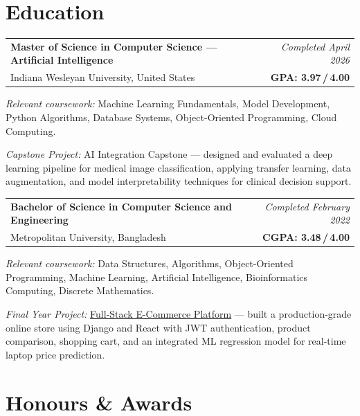 \documentclass[11pt, letterpaper]{article}
\begin{document}
\section{Education}

\noindent
\begin{tabularx}{\linewidth}{@{}X r@{}}
  \textbf{Master of Science in Computer Science — Artificial Intelligence}
    & \textit{Completed April 2026} \\
  Indiana Wesleyan University, United States
    & \textbf{GPA: 3.97\,/\,4.00}
\end{tabularx}

\vspace{3pt}
\textit{Relevant coursework:} Machine Learning Fundamentals, Model Development,
Python Algorithms, Database Systems, Object-Oriented Programming, Cloud Computing.

\vspace{3pt}
\textit{Capstone Project:} AI Integration Capstone — designed and evaluated a
deep learning pipeline for medical image classification, applying transfer learning,
data augmentation, and model interpretability techniques for clinical decision support.

\vspace{8pt}

\noindent
\begin{tabularx}{\linewidth}{@{}X r@{}}
  \textbf{Bachelor of Science in Computer Science and Engineering}
    & \textit{Completed February 2022} \\
  Metropolitan University, Bangladesh
    & \textbf{CGPA: 3.48\,/\,4.00}
\end{tabularx}

\vspace{3pt}
\textit{Relevant coursework:} Data Structures, Algorithms, Object-Oriented
Programming, Machine Learning, Artificial Intelligence, Bioinformatics Computing,
Discrete Mathematics.

\vspace{3pt}
\textit{Final Year Project:} \href{https://github.com/ayanchyaziz123/final-year-project-main}{Full-Stack E-Commerce Platform} —
built a production-grade online store using Django and React with JWT authentication,
product comparison, shopping cart, and an integrated ML regression model for
real-time laptop price prediction.

\section{Honours \& Awards}
\end{document}
